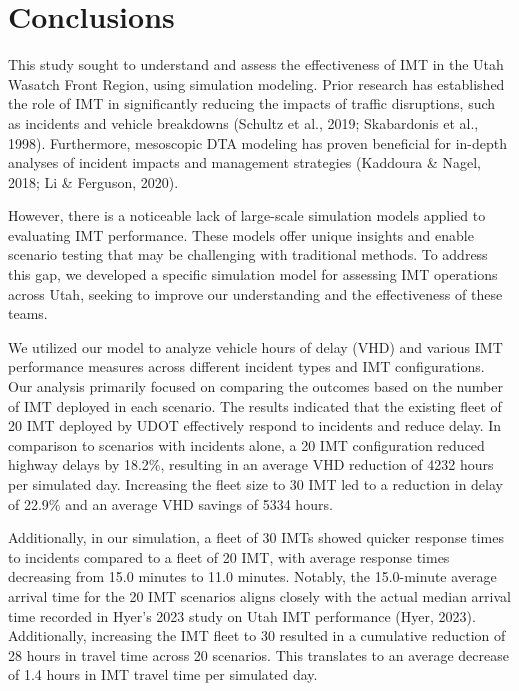\documentclass[fancy, oneside, mastersfancy, ms]{byuthesis}
\begin{document}
\hypertarget{sec-conclusions}{%
\chapter{Conclusions}\label{sec-conclusions}}

This study sought to understand and assess the effectiveness of IMT in
the Utah Wasatch Front Region, using simulation modeling. Prior research
has established the role of IMT in significantly reducing the impacts of
traffic disruptions, such as incidents and vehicle breakdowns (Schultz
et al., 2019; Skabardonis et al., 1998). Furthermore, mesoscopic DTA
modeling has proven beneficial for in-depth analyses of incident impacts
and management strategies (Kaddoura \& Nagel, 2018; Li \& Ferguson,
2020).

However, there is a noticeable lack of large-scale simulation models
applied to evaluating IMT performance. These models offer unique
insights and enable scenario testing that may be challenging with
traditional methods. To address this gap, we developed a specific
simulation model for assessing IMT operations across Utah, seeking to
improve our understanding and the effectiveness of these teams.

We utilized our model to analyze vehicle hours of delay (VHD) and
various IMT performance measures across different incident types and IMT
configurations. Our analysis primarily focused on comparing the outcomes
based on the number of IMT deployed in each scenario. The results
indicated that the existing fleet of 20 IMT deployed by UDOT effectively
respond to incidents and reduce delay. In comparison to scenarios with
incidents alone, a 20 IMT configuration reduced highway delays by
18.2\%, resulting in an average VHD reduction of 4232 hours per
simulated day. Increasing the fleet size to 30 IMT led to a reduction in
delay of 22.9\% and an average VHD savings of 5334 hours.

Additionally, in our simulation, a fleet of 30 IMTs showed quicker
response times to incidents compared to a fleet of 20 IMT, with average
response times decreasing from 15.0 minutes to 11.0 minutes. Notably,
the 15.0-minute average arrival time for the 20 IMT scenarios aligns
closely with the actual median arrival time recorded in Hyer's 2023
study on Utah IMT performance (Hyer, 2023). Additionally, increasing the
IMT fleet to 30 resulted in a cumulative reduction of 28 hours in travel
time across 20 scenarios. This translates to an average decrease of 1.4
hours in IMT travel time per simulated day.
\end{document}
